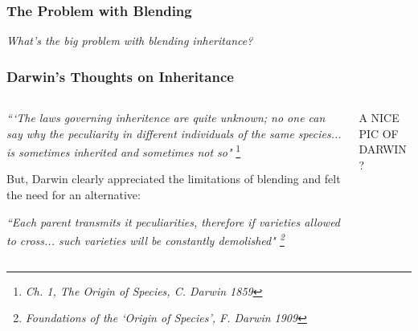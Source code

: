 \documentclass{beamer}
\begin{document}
\begin{frame}
		\frametitle{The Problem with Blending}
		
				\Huge \centering \emph{What's the big problem with blending inheritance?}
\end{frame}




\begin{frame}
	\frametitle{Darwin's Thoughts on Inheritance}
	\begin{columns}
		\begin{column}{0.5\textwidth}
			\small
			\textit{```The laws governing inheritence are quite unknown; no one can say why the peculiarity in different individuals of the same species... is sometimes inherited and sometimes not so"} \footnote[1]{\textit{Ch. 1, The Origin of Species, C. Darwin 1859}}
			
			\vspace{10pt}
			
			But, Darwin clearly appreciated the limitations of blending and felt the need for an alternative:
			
			\vspace{10pt}
			
			\textit{``Each parent transmits it peculiarities, therefore if varieties allowed to cross... such varieties will be constantly demolished" \footnote[2]{\textit{ Foundations of the `Origin of Species', F. Darwin 1909}}}
		\end{column}
		\begin{column}{0.4\textwidth}
			A NICE PIC OF DARWIN?
		\end{column}
	\end{columns}
	
	
	
\end{frame}
\end{document}

